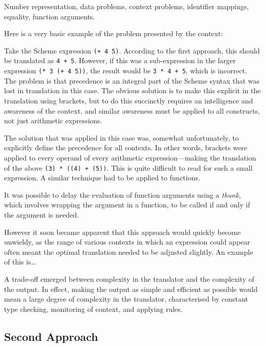 Number representation, data problems, context problems, identifier mappings,
equality, function arguments.

Here is a very basic example of the problem presented by the context:
\begin{framed}
Take the Scheme expression \texttt{(+ 4 5)}. According to the first approach,
this should be translated as \texttt{4 + 5}. However, if this was a
sub-expression in the larger expression \texttt{(*~3~(+~4~5))}, the result would
be \texttt{3~*~4~+~5}, which is incorrect. The problem is that precedence is
an integral part of the Scheme syntax that was lost in translation in this case.
The obvious solution is to make this explicit in the translation using brackets,
but to do this succinctly requires an intelligence and awareness of the context,
and similar awareness must be applied to all constructs, not just arithmetic
expressions.
\end{framed}
The solution that was applied in this case was, somewhat unfortunately, to
explicitly define the precedence for all contexts. In other words, brackets were
applied to every operand of every arithmetic expression---making the translation
of the above \texttt{(3) * ((4) + (5))}. This is quite difficult to read for
such a small expression. A similar technique had to be applied to functions.

It was possible to delay the evaluation of function arguments using a
\emph{thunk}, which involves wrapping the argument in a function, to be called
if and only if the argument is needed.

However it soon became apparent that this approach would quickly become
unwieldy, as the range of various contexts in which an expression could appear
often meant the optimal translation needed to be adjusted slightly. An example
of this is\ldots

A trade-off emerged between complexity in the translator and the complexity of
the output. In effect, making the output as simple and efficient as
possible would mean a large degree of complexity in the translator,
characterised by constant type checking, monitoring of context, and applying
rules.

\subsection{Second Approach}

